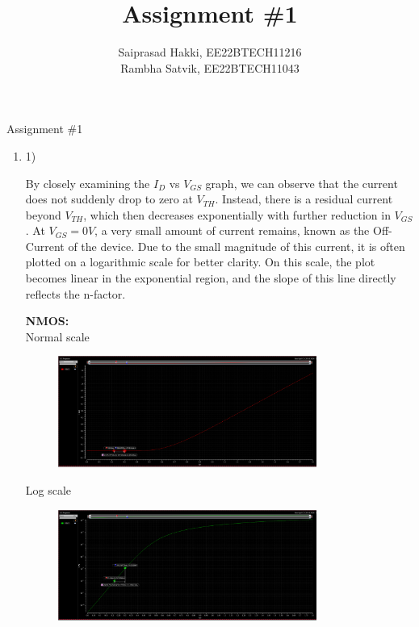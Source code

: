 \documentclass[journal, onecolumn]{IEEEtran} %
\begin{document}
\title{Assignment \#1}
\author{Saiprasad Hakki, \normalsize{EE22BTECH11216}\\
		Rambha Satvik, \normalsize{EE22BTECH11043}}%
\maketitle
{}%
{Assignment \#1}

\begin{enumerate}[2.]
	\item1) {
		\par{

		By closely examining the $I_{D}$ vs $V_{GS}$ graph, we can observe that the current does not suddenly drop to zero at $V_{TH}$. Instead, there is a residual current beyond $V_{TH}$, which then decreases exponentially with further reduction in $V_{GS}$. At $V_{GS}= 0V$, a very small amount of current remains, known as the Off-Current of the device. Due to the small magnitude of this current, it is often plotted on a logarithmic scale for better clarity. On this scale, the plot becomes linear in the exponential region, and the slope of this line directly reflects the n-factor.\\
		}
			\textbf{NMOS:}\\
			Normal scale
			\begin{figure}[H]
				\centering
				\includegraphics[width=0.8\textwidth]{IdVgNMOS}
				\caption{}
				\label{fig:IdVgNMOS}
			\end{figure}

			Log scale
			\begin{figure}[H]
				\centering
				\includegraphics[width=0.8\textwidth]{IdVgNMOSlog}
				\caption{}
				\label{fig:IdVgNMOSlog}
			\end{figure}

}
\end{enumerate}
\end{document}
